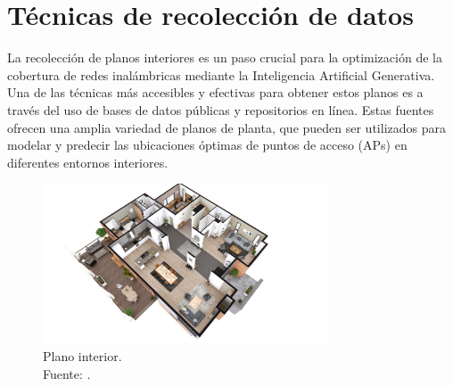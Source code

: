 \section{Técnicas de recolección de datos}
La recolección de planos interiores es un paso crucial para la optimización de la cobertura de redes inalámbricas mediante la Inteligencia Artificial Generativa. Una de las técnicas más accesibles y efectivas para obtener estos planos es a través del uso de bases de datos públicas y repositorios en línea. Estas fuentes ofrecen una amplia variedad de planos de planta, que pueden ser utilizados para modelar y predecir las ubicaciones óptimas de puntos de acceso (APs) en diferentes entornos interiores.

\begin{figure}[h]
	\begin{center}
		\includegraphics[width=0.75\textwidth]{3/figures/plano2d.jpg}
		\caption[Plano interior]{Plano interior.\\
			Fuente: \cite{art_wu2019interior}.}
		\label{3:fig1}
	\end{center}
\end{figure}

